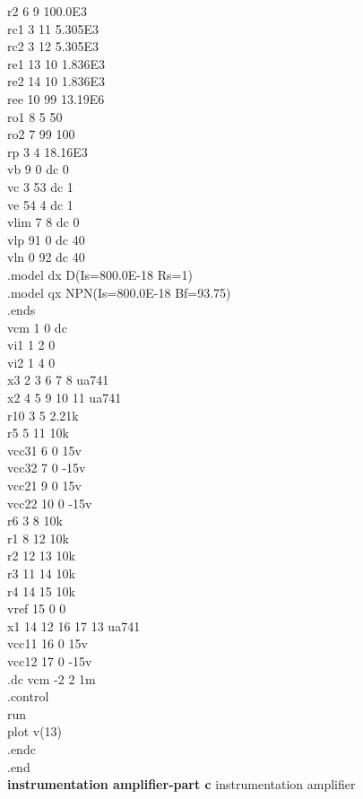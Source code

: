 \documentclass[12pt]{article}
\begin{document}
r2    6  9 100.0E3\\
rc1   3 11 5.305E3\\
rc2   3 12 5.305E3\\
re1  13 10 1.836E3\\
re2  14 10 1.836E3\\
ree  10 99 13.19E6\\
ro1   8  5 50\\
ro2   7 99 100\\
rp    3  4 18.16E3\\
vb    9  0 dc 0\\
vc    3 53 dc 1\\
ve   54  4 dc 1\\
vlim  7  8 dc 0\\
vlp  91  0 dc 40\\
vln   0 92 dc 40\\
.model dx D(Is=800.0E-18 Rs=1)\\
.model qx NPN(Is=800.0E-18 Bf=93.75)\\
.ends\\
\newpage
vcm 1 0 dc\\ 
vi1 1 2 0\\
vi2 1 4 0\\
x3 2 3 6 7 8 ua741\\
x2 4 5 9 10 11 ua741\\
r10 3 5 2.21k\\
r5 5 11 10k\\
vcc31 6 0 15v\\
vcc32 7 0 -15v\\
vcc21 9 0 15v\\
vcc22 10 0 -15v\\
r6 3 8 10k\\
r1 8 12 10k\\
r2 12 13 10k\\
r3 11 14 10k\\
r4 14 15 10k\\
vref 15 0 0\\
x1 14 12 16 17 13 ua741\\
vcc11 16 0 15v\\
vcc12 17 0 -15v\\
.dc vcm -2 2 1m\\
.control\\
run\\
plot v(13)\\
.endc\\
.end \\
\newpage
\textbf{instrumentation amplifier-part c}
instrumentation amplifier\\
\end{document}
